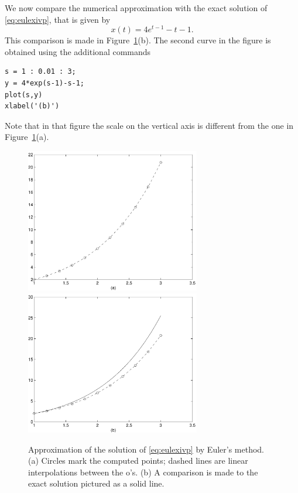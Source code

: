 \documentclass{ximera}
\begin{document}
We now compare the numerical approximation with the exact solution 
of \eqref{eq:eulexivp}, that is given by
\[
x(t) = 4e^{t-1}-t-1.
\]
This comparison is made in Figure~\ref{fig:eulex1}(b).  The second
curve in the figure is obtained using the additional commands
\begin{verbatim}
s = 1 : 0.01 : 3;
y = 4*exp(s-1)-s-1;  
plot(s,y)        
xlabel('(b)')
\end{verbatim}
Note that in that figure the scale on the vertical axis is
different from the one in Figure~\ref{fig:eulex1}(a).
\begin{figure}[htb]
   \centerline{%
   \includegraphics[width=3in]{../figures/eulex1.pdf}
   \includegraphics[width=3in]{../figures/eulex2.pdf}}
   \caption{Approximation of the solution of 
   \protect\eqref{eq:eulexivp} by Euler's method.  
   (a) Circles mark the computed points; dashed lines 
    are linear interpolations between the o's.  (b)  A comparison is 
    made to the exact solution pictured as a solid line.}
   \label{fig:eulex1}
\end{figure}
\end{document}
